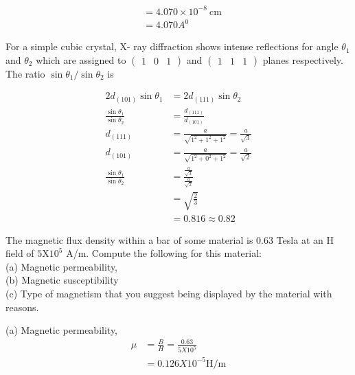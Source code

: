 \begin{enumerate}
\begin{answer}
$$\begin{aligned}
		&=4.070 \times 10^{-8} \mathrm{~cm} \\
		&=4.070 A^{0}
		\end{aligned}
		$$	
	\end{answer}
	\begin{minipage}{\textwidth}
		\item For a simple cubic crystal, X- ray diffraction shows intense reflections for angle $\theta_{1}$ and $\theta_{2}$ which are assigned to $\left(\begin{array}{lll}1 & 0 & 1\end{array}\right)$ and $\left(\begin{array}{lll}1 & 1 & 1\end{array}\right)$ planes respectively. The ratio $\sin \theta_{1} / \sin \theta_{2}$ is
	\end{minipage}
	\begin{answer}
		$$
		\begin{aligned}
		2 d_{(101)} \sin \theta_{1} &=2 d_{(111)} \sin \theta_{2} \\
		\frac{\sin \theta_{1}}{\sin \theta_{2}} &=\frac{d_{(111)}}{d_{(101)}} \\
		d_{(111)} &=\frac{a}{\sqrt{1^{2}+1^{2}+1^{2}}}=\frac{a}{\sqrt{3}} \\
		d_{(101)} &=\frac{a}{\sqrt{1^{2}+0^{2}+1^{2}}}=\frac{a}{\sqrt{2}} \\
		\frac{\sin \theta_{1}}{\sin \theta_{2}} &=\frac{\frac{a}{\sqrt{3}}}{\frac{a}{\sqrt{2}}} \\
		&=\sqrt{\frac{2}{3}} \\
		&=0.816 \approx 0.82
		\end{aligned}
		$$	
	\end{answer}
	\begin{minipage}{\textwidth}
		\item The magnetic flux density within a bar of some material is $0.63$ Tesla at an $\mathrm{H}$ field of $5 \mathrm{X} 10^{5}$ A/m. Compute the following for this material:\\ (a) Magnetic permeability, \\(b) Magnetic susceptibility\\ (c) Type of magnetism that you suggest being displayed by the material with reasons.
	\end{minipage}
	\begin{answer}$\left. \right. $\\
		(a) Magnetic permeability, 
		\begin{align*}
		\mu&=\frac{B}{H}=\frac{0.63}{5 X 10^{5}}\\&=0.126 X 10^{-5} \mathrm{H} / \mathrm{m}

\end{align*}
\end{answer}
\end{enumerate}
